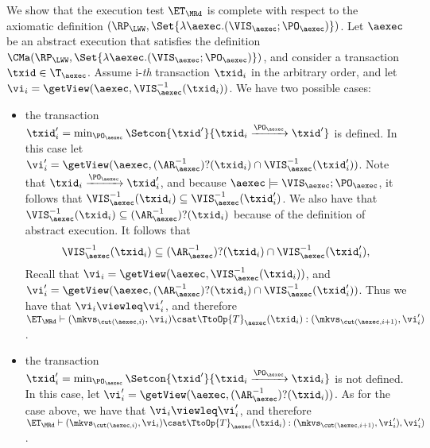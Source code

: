 We show that the execution test $\ET_{\MRd}$ is complete 
with respect to the axiomatic definition $(\RP_{\LWW}, \Set{\lambda \aexec.(\VIS_{\aexec};\PO_{\aexec})})$. 
Let $\aexec$ be an abstract execution that satisfies the definition
$\CMa(\RP_{\LWW}, \Set{\lambda \aexec.(\VIS_{\aexec};\PO_{\aexec})})$, 
and consider a transaction $\txid \in \T_{\aexec}$. 
Assume i-\emph{th} transaction \( \txid_i \) in the arbitrary order,
and let $\vi_i = \getView(\aexec, \VIS^{-1}_{\aexec}(\txid_{i}))$.
We have two possible cases: 
\begin{itemize}
    \item the transaction $\txid'_{i} = \min_{\PO_{\aexec}}\Setcon{\txid' }{ \txid_{i} \xrightarrow{\PO_{\aexec}} \txid'}$ is 
defined. In this case let $\vi'_{i} =\getView(\aexec, (\AR^{-1}_{\aexec})?(\txid_{i}) \cap \VIS^{-1}_{\aexec}(\txid'_{i}))$. 
Note that $\txid_{i} \xrightarrow{\PO_{\aexec}} \txid'_{i}$, and because $\aexec \models \VIS_{\aexec} ; \PO_{\aexec}$, 
it follows that $\VIS^{-1}_{\aexec}(\txid_{i}) \subseteq \VIS^{-1}_{\aexec}(\txid'_{i})$. 
We also have that $\VIS^{-1}_{\aexec}(\txid_{i}) \subseteq (\AR^{-1}_{\aexec})?(\txid_{i})$ because of 
the definition of abstract execution. It follows that 
\[
\VIS^{-1}_{\aexec}(\txid_{i}) \subseteq (\AR^{-1}_{\aexec})?(\txid_{i}) \cap \VIS^{-1}_{\aexec}(\txid'_{i}),
\]
Recall that  $\vi_i = \getView(\aexec, \VIS^{-1}_{\aexec}(\txid_{i}))$, 
and $\vi'_{i} =\getView(\aexec, (\AR^{-1}_{\aexec})?(\txid_{i}) \cap \VIS^{-1}_{\aexec}(\txid'_{i}))$. 
Thus we have that $\vi_i \viewleq \vi'_{i}$, and therefore $\ET_{\MRd} \vdash (\mkvs_{\cut(\aexec, i)}, \vi_i) 
\csat \TtoOp{T}_{\aexec}(\txid_{i}) : (\mkvs_{\cut(\aexec, i+1)},\vi'_{i})$. 
\item the transaction $\txid'_{i} = \min_{\PO_{\aexec}}\Setcon{\txid' }{ \txid_{i} \xrightarrow{\PO_{\aexec}} \txid_{i}}$ 
is not defined. In this case, let $\vi'_{i} = \getView(\aexec, (\AR^{-1}_{\aexec})?(\txid_{i}))$. 
As for the case above, we have that $\vi_i \viewleq \vi'_{i}$, and therefore 
$\ET_{\MRd} \vdash (\mkvs_{\cut(\aexec, i)}, \vi_i) \csat \TtoOp{T}_{\aexec}(\txid_{i}) : (\mkvs_{\cut(\aexec, i+1)},\vi'_{i}),\vi'_{i})$. 
\end{itemize}
